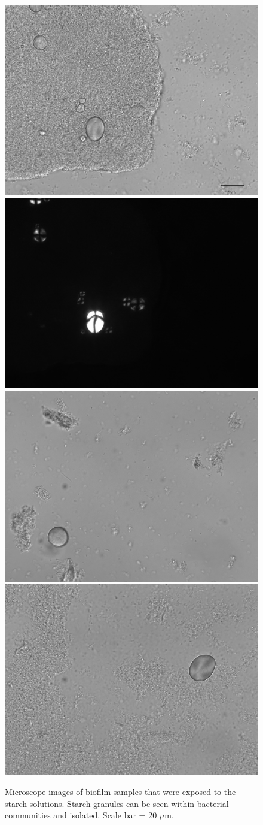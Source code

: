 \documentclass[utf8]{../templates/frontiersSCNS}
\begin{document}
\begin{figure}[H]

{\centering \includegraphics[width=0.4\linewidth]{../figures/starches_w_bar} \includegraphics[width=0.4\linewidth]{../figures/st2C3.2-mix} \includegraphics[width=0.4\linewidth]{../figures/st1B4-wheat} \includegraphics[width=0.4\linewidth]{../figures/2D2-potato} 

}

\caption{Microscope images of biofilm samples that were exposed to the starch solutions. Starch granules can be seen within bacterial communities and isolated. Scale bar = 20 $\mu$m.}\label{fig:microscope-fig}
\end{figure}
\end{document}
